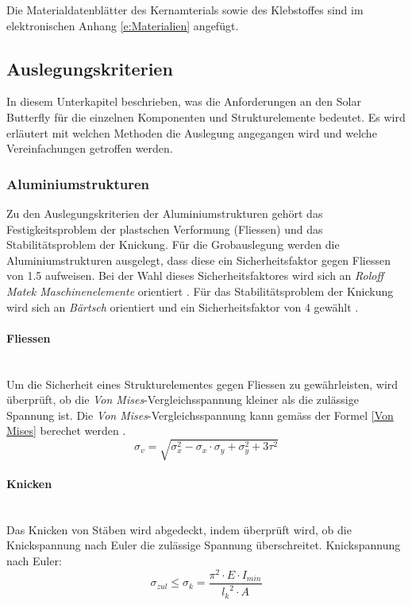 Die Materialdatenblätter des Kernamterials sowie des Klebstoffes sind im elektronischen Anhang \ref{e:Materialien} angefügt.


\subsection{Auslegungskriterien}
In diesem Unterkapitel beschrieben, was die Anforderungen an den Solar Butterfly für die einzelnen Komponenten und Strukturelemente bedeutet. Es wird erläutert mit welchen Methoden die Auslegung angegangen wird und welche Vereinfachungen getroffen werden.\\

  \subsubsection{Aluminiumstrukturen}
  Zu den Auslegungskriterien der Aluminiumstrukturen gehört das Festigkeitsproblem der plastschen Verformung (Fliessen) und das Stabilitätsproblem der Knickung. Für die Grobauslegung werden die Aluminiumstrukturen ausgelegt, dass diese ein Sicherheitsfaktor gegen Fliessen von 1.5 aufweisen. Bei der Wahl dieses Sicherheitsfaktores wird sich an \emph{Roloff Matek Maschinenelemente} orientiert \cite{Roloff}. Für das Stabilitätsproblem der Knickung wird sich an \emph{Bärtsch} orientiert und ein Sicherheitsfaktor von 4 gewählt \cite{Baertsch}.

  \paragraph{Fliessen}\mbox{}\\
  Um die Sicherheit eines Strukturelementes gegen Fliessen zu gewährleisten, wird überprüft, ob die \emph{Von Mises}-Vergleichsspannung kleiner als die zulässige Spannung ist. Die \emph{Von Mises}-Vergleichsspannung kann gemäss der Formel \ref{Von Mises} berechet werden \cite{Baertsch}.
  \begin{equation}
    \label{Von Mises}
    \sigma_v = \sqrt{\sigma_x^{2}-\sigma_x \cdot \sigma_y + \sigma_y^2 + 3\tau^2}
  \end{equation}

  \paragraph{Knicken}\mbox{}\\
  Das Knicken von Stäben wird abgedeckt, indem überprüft wird, ob die Knickspannung nach Euler die zulässige Spannung überschreitet. Knickspannung nach Euler:
  \begin{equation}
    \sigma_{zul} \leq \sigma_k = \frac{\pi^2 \cdot E \cdot I_{min}}{{l_k}^2 \cdot A}
  \end{equation}

